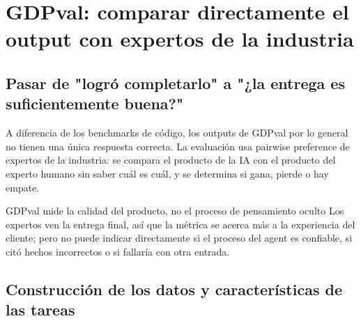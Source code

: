 \section{GDPval: comparar directamente el output con expertos de la industria}

\subsection{Pasar de "logró completarlo" a "¿la entrega es suficientemente buena?"}




A diferencia de los benchmarks de código, los outputs de GDPval por lo general no tienen una única respuesta correcta. La evaluación usa pairwise preference de expertos de la industria: se compara el producto de la IA con el producto del experto humano sin saber cuál es cuál, y se determina si gana, pierde o hay empate.

\begin{importantbox}{GDPval mide la calidad del producto, no el proceso de pensamiento oculto}
Los expertos ven la entrega final, así que la métrica se acerca más a la experiencia del cliente; pero no puede indicar directamente si el proceso del agent es confiable, si citó hechos incorrectos o si fallaría con otra entrada.
\end{importantbox}

\subsection{Construcción de los datos y características de las tareas}


